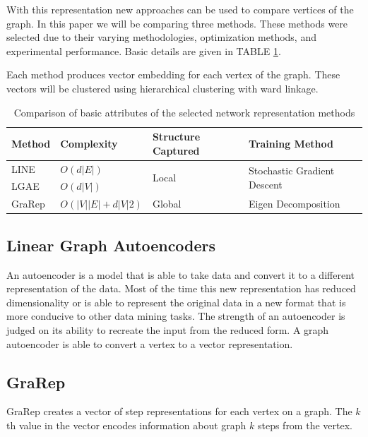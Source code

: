 \documentclass[journal,compsoc]{IEEEtran}
\begin{document}
With this representation new approaches can be used to compare vertices of the graph. In this paper we will be comparing three methods. These methods were selected due to their varying methodologies, optimization methods, and experimental performance. Basic details are given in TABLE \ref{NWRC}.

Each method produces vector embedding for each vertex of the graph. These vectors will be clustered using hierarchical clustering with ward linkage.

\renewcommand{\arraystretch}{1.2}
\begin{table}[t]
	\begin{tabular}{|l|l|l|l|}
		\hline
		Method & Complexity      & Structure Captured     & Training Method                              \\
		\hline
		LINE   & $O(d|E|)$         & \multirow{2}{*}{Local} & \multirow{2}{*}{Stochastic Gradient Descent} \\
		\cline{1-2}
		LGAE   & $O(d|V|)$         &                        &                                              \\
		\hline
		GraRep & $O(|V||E|+d|V|2)$ & Global                 & Eigen Decomposition \\
		\hline
	\end{tabular}
	\caption{Comparison of basic attributes of the selected network representation methods}
	\label{NWRC}
\end{table}
\renewcommand{\arraystretch}{1}

\subsection{Linear Graph Autoencoders \cite{SalhaGalvan2019KeepIS}}
An autoencoder is a model that is able to take data and convert it to a different representation of the data. Most of the time this new representation has reduced dimensionality or is able to represent the original data in a new format that is more conducive to other data mining tasks. The strength of an autoencoder is judged on its ability to recreate the input from the reduced form. A graph autoencoder is able to convert a vertex to a vector representation.

\subsection{GraRep \cite{Cao2015GraRepLG}}
GraRep creates a vector of step representations for each vertex on a graph. The ${k}$th value in the vector encodes information about graph ${k}$ steps from the vertex.
\end{document}
